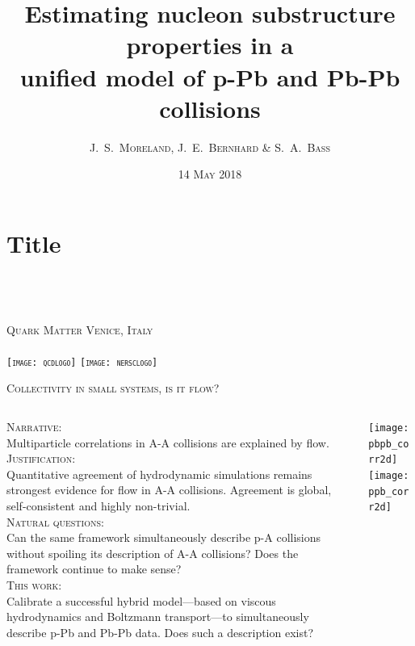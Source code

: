 \documentclass[aspectratio=169]{beamer}
\title{Estimating nucleon substructure properties in a\\[.2ex]
unified model of p-Pb and Pb-Pb collisions}
\author[J.\ S.\ Moreland]{\scshape J.\ S.\ Moreland, J.\ E.\ Bernhard \& S.\ A.\ Bass}
\institute[Duke]{\scshape Duke University}
\date{\scshape 14 May 2018}
\newcommand{\conference}{\scshape Quark Matter \enskip\textbar\enskip Venice, Italy}
\begin{document}
\section{Title}

\begin{frame}
  \centering
  \textcolor{theme}{\Large \inserttitle} \\[3ex]
  \insertauthor \\
  \insertinstitute \\[2ex]
  \conference \\
  \insertdate \\[6ex]
  \texttt{[image: qcdlogo]}\quad
  \texttt{[image: nersclogo]}\\[3ex]
\end{frame}


\newcommand{\boxtitle}[1]{\textbf{#1}\\[.5ex]}

\begin{frame}{\scshape Collectivity in small systems, is it flow?}
  \smallskip
  \begin{columns}[T]
    \begin{column}{.7\textwidth}
      \medskip \small
      \textcolor{theme}{\scshape Narrative:}\\[.5ex]
      Multiparticle correlations in A-A collisions are explained by flow.\\[1ex]
      \textcolor{theme}{\scshape Justification:}\\[.5ex]
      Quantitative agreement of hydrodynamic simulations remains strongest evidence for flow in A-A collisions. Agreement is global, self-consistent and highly non-trivial.\\[1ex]
      \textcolor{theme}{\scshape Natural questions:}\\[.5ex]
      Can the same framework simultaneously describe p-A collisions without spoiling its description of A-A collisions? Does the framework continue to make sense?\\[1ex]
      \textcolor{theme}{\scshape This work:}\\[.5ex]
      Calibrate a successful hybrid model---based on viscous hydrodynamics and Boltzmann transport---to simultaneously describe p-Pb and Pb-Pb data. Does such a description exist?
    \end{column}
    \begin{column}{.3\textwidth}
      \centering
      \texttt{[image: pbpb\_corr2d]}\\
      \texttt{[image: ppb\_corr2d]}
    \end{column}
  \end{columns}

\end{frame}
\end{document}
